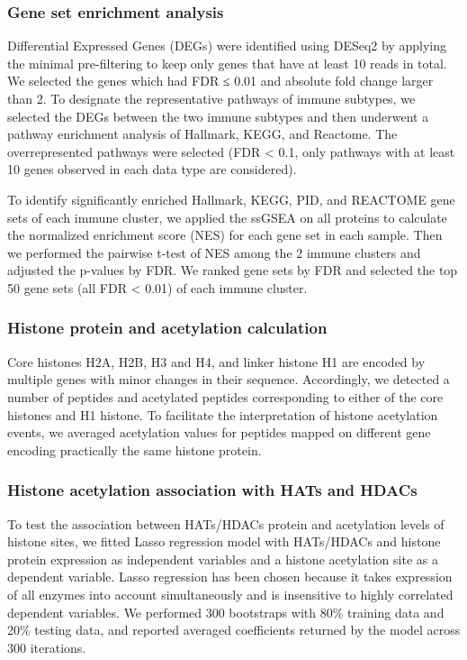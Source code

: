 \subsubsection{Gene set enrichment analysis}
Differential Expressed Genes (DEGs) were identified using DESeq2 \cite{lovemi_anderss:ModeratedEstimation2014} by applying the minimal pre-filtering to keep only genes that have at least 10 reads in total. We selected the genes which had FDR ≤ 0.01 and absolute fold change larger than 2. To designate the representative pathways of immune subtypes, we selected the DEGs between the two immune subtypes and then underwent a pathway enrichment analysis of Hallmark, KEGG, and Reactome. The overrepresented pathways were selected (FDR < 0.1, only pathways with at least 10 genes observed in each data type are considered).

To identify significantly enriched Hallmark, KEGG, PID, and REACTOME gene sets of each immune cluster, we applied the ssGSEA on all proteins to calculate the normalized enrichment score (NES) for each gene set in each sample. Then we performed the pairwise t-test of NES among the 2 immune clusters and adjusted the p-values by FDR. We ranked gene sets by FDR and selected the top 50 gene sets (all FDR < 0.01) of each immune cluster.

\subsubsection{Histone protein and acetylation calculation}
Core histones H2A, H2B, H3 and H4, and linker histone H1 are encoded by multiple genes with minor changes in their sequence. Accordingly, we detected a number of peptides and acetylated peptides corresponding to either of the core histones and H1 histone. To facilitate the interpretation of histone acetylation events, we averaged acetylation values for peptides mapped on different gene encoding practically the same histone protein.

\subsubsection{Histone acetylation association with HATs and HDACs}
To test the association between HATs/HDACs protein and acetylation levels of histone sites, we fitted Lasso regression model with HATs/HDACs and histone protein expression as independent variables and a histone acetylation site as a dependent variable. Lasso regression has been chosen because it takes expression of all enzymes into account simultaneously and is insensitive to highly correlated dependent variables. We performed 300 bootstraps with 80\% training data and 20\% testing data, and reported averaged coefficients returned by the model across 300 iterations.

